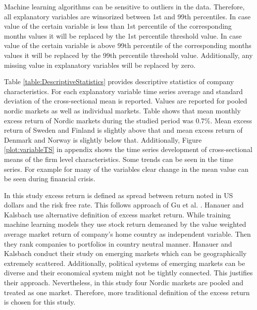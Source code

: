 \documentclass{article}
\begin{document}
Machine learning algorithms can be sensitive to outliers in the data. Therefore, all explanatory variables are winsorized between 1st and 99th percentiles. In case value of the certain variable is less than 1st percentile of the corresponding months values it will be replaced by the 1st percentile threshold value. In case value of the certain variable is above 99th percentile of the corresponding months values it will be replaced by the 99th percentile threshold value. %
Additionally, any missing value in explanatory variables will be replaced by zero. \par

Table \ref{table:DescriptiveStatistics} provides descriptive statistics of company characteristics. For each explanatory variable time series average and standard deviation of the cross-sectional mean is reported. Values are reported for pooled nordic markets as well as individual markets. Table shows that mean monthly excess return of Nordic markets during the studied period was 0.7\%. Mean excess return of Sweden and Finland is slightly above that and mean excess return of Denmark and Norway is slightly below that. Additionally, Figure \ref{plot:variableTS} in appendix shows the time series development of cross-sectional means of the firm level characteristics. Some trends can be seen in the time series. For example for many of the variables clear change in the mean value can be seen during financial crisis. 

In this study excess return is defined as spread between return noted in US dollars and the risk free rate. This follows approach of Gu et al. \citeyear{guetal}. Hanauer and Kalsbach \citeyear{HANAUER2023} use alternative definition of excess market return. While training machine learning models they use stock return demeaned by the value weighted average market return of company's home country as independent variable. Then they rank companies to portfolios in country neutral manner. Hanauer and Kalsbach conduct their study on emerging markets which can be geographically extremely scattered. Additionally, political systems of emerging markets can be diverse and their economical system might not be tightly connected. This justifies their approach. Nevertheless, in this study four Nordic markets are pooled and treated as one market. Therefore, more traditional definition of the excess return is chosen for this study. \par

\end{document}
